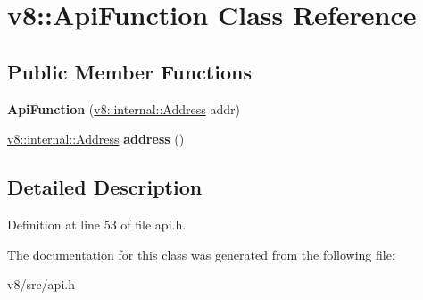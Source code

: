 \hypertarget{classv8_1_1ApiFunction}{}\section{v8\+:\+:Api\+Function Class Reference}
\label{classv8_1_1ApiFunction}
\subsection*{Public Member Functions}
\begin{DoxyCompactItemize}
\item 
\mbox{\label{classv8_1_1ApiFunction_a711c062e7328b2cd864a755290ccc70c}} 
{\bfseries Api\+Function} (\mbox{\hyperlink{classuintptr__t}{v8\+::internal\+::\+Address}} addr)
\item 
\mbox{\label{classv8_1_1ApiFunction_ae3168a2d34c3c799c4aae32a9c3bdba2}} 
\mbox{\hyperlink{classuintptr__t}{v8\+::internal\+::\+Address}} {\bfseries address} ()
\end{DoxyCompactItemize}


\subsection{Detailed Description}


Definition at line 53 of file api.\+h.



The documentation for this class was generated from the following file\+:\begin{DoxyCompactItemize}
\item 
v8/src/api.\+h\end{DoxyCompactItemize}
